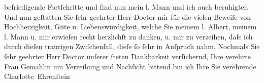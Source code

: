 \begin{ledgroupsized}[t]{13cm}
                    befriedigende Fortſchritte {\pb}und ſind nun mein l. Mann und ich auch beruhigter.\pend
           \pstart
           Und nun geſtatten Sie ſehr geehrter Herr Doctor mir für die vielen Beweiſe von
                    Hochherzigkeit, Güte u. Liebenswürdigkeit, welche Sie meinem l. Albert, meinem l. Mann u. mir erwieſen recht herzlichſt zu danken, u.
                    mir zu verzeihen, daſs ich durch dieſen traurigen Zwiſchenfall, dieſe ſo ſehr in
                    Anſpruch nahm.\pend
           \pstart
           {\pb}Nochmals Sie ſehr geehrter Herr Doctor unſerer ſteten Dankbarkeit
                    verſichernd, Ihre verehrte Frau Gemahlin um Verzeihung und Nachſicht bittend bin ich Ihre Sie
                    verehrende\pend
           \pstart \spacefill\mbox{Charlotte Ehrenſtein}\pend{}
         
         \endnumbering{}\end{ledgroupsized}  \newcommand{\dateiname}{L01576}\newcommand{\titel}{Charlotte Ehrenstein an Arthur Schnitzler, [22. 1.? 1906]}\newcommand{\editorInnen}{Martin Anton Müller und Gerd-Hermann Susen}
      